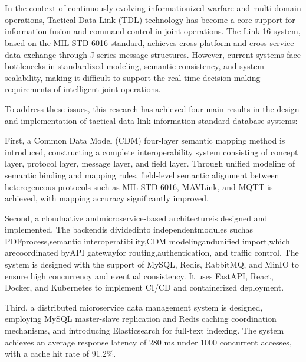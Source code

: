 \newpage
\vspace{-1cm}
\chapter*{}
\vspace{-0.5cm}

In the context of continuously evolving informationized warfare and multi-domain operations, Tactical Data Link (TDL) technology has become a core support for information fusion and command control in joint operations. The Link 16 system, based on the MIL-STD-6016 standard, achieves cross-platform and cross-service data exchange through J-series message structures. However, current systems face bottlenecks in standardized modeling, semantic consistency, and system scalability, making it difficult to support the real-time decision-making requirements of intelligent joint operations.

To address these issues, this research has achieved four main results in the design and implementation of tactical data link information standard database systems:

First, a Common Data Model (CDM) four-layer semantic mapping method is introduced, constructing a complete interoperability system consisting of concept layer, protocol layer, message layer, and field layer. Through unified modeling of semantic binding and mapping rules, field-level semantic alignment between heterogeneous protocols such as MIL-STD-6016, MAVLink, and MQTT is achieved, with mapping accuracy significantly improved.

Second, a cloudnative andmicroservice-based architectureis designed and implemented. The backendis dividedinto independentmodules suchas PDFprocess,semantic interoperatibility,CDM modelingandunified import,which arecoordinated byAPI gatewayfor routing,authentication, and traffic control. The system is designed with the support of MySQL, Redis, RabbitMQ, and MinIO to ensure high concurrency and eventual consistency. It uses FastAPI, React, Docker, and Kubernetes to implement CI/CD and containerized deployment.

Third, a distributed microservice data management system is designed, employing MySQL master-slave replication and Redis caching coordination mechanisms, and introducing Elasticsearch for full-text indexing. The system achieves an average response latency of 280 ms under 1000 concurrent accesses, with a cache hit rate of 91.2\%.

